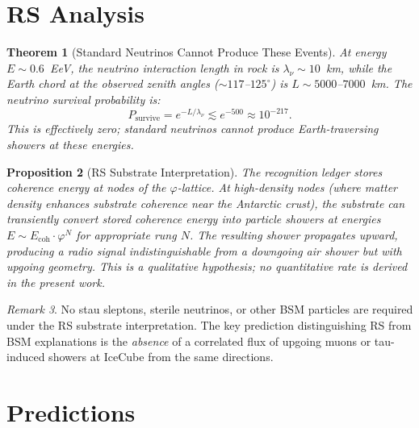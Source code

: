 \documentclass[12pt,a4paper]{article}
\newtheorem{theorem}{Theorem}[section]
\newtheorem{proposition}[theorem]{Proposition}
\theoremstyle{definition}
\theoremstyle{remark}
\newtheorem{remark}[theorem]{Remark}
\begin{document}
\section{RS Analysis}
\label{sec:analysis}

\begin{theorem}[Standard Neutrinos Cannot Produce These Events]
\label{thm:nu-impossible}
At energy $E \sim 0.6$~EeV, the neutrino interaction length in
rock is $\lambda_\nu \sim 10$~km, while the Earth chord at the
observed zenith angles ($\sim 117$--$125^\circ$) is
$L \sim 5000$--$7000$~km.  The neutrino survival probability is:
\begin{equation}
  P_{\mathrm{survive}} = e^{-L/\lambda_\nu} \lesssim e^{-500}
  \approx 10^{-217}.
\end{equation}
This is effectively zero; standard neutrinos cannot produce
Earth-traversing showers at these energies.
\end{theorem}

\begin{proposition}[RS Substrate Interpretation]
\label{prop:substrate}
The recognition ledger stores coherence energy at nodes of the
$\varphi$-lattice.  At high-density nodes (where matter density
enhances substrate coherence near the Antarctic crust), the
substrate can transiently convert stored coherence energy into
particle showers at energies $E \sim E_{\mathrm{coh}} \cdot \varphi^N$
for appropriate rung $N$.  The resulting shower propagates upward,
producing a radio signal indistinguishable from a downgoing air shower
but with upgoing geometry.  This is a qualitative hypothesis; no
quantitative rate is derived in the present work.
\end{proposition}

\begin{remark}
No stau sleptons, sterile neutrinos, or other BSM particles are
required under the RS substrate interpretation.  The key prediction
distinguishing RS from BSM explanations is the \emph{absence} of
a correlated flux of upgoing muons or tau-induced showers at IceCube
from the same directions.
\end{remark}

\section{Predictions}
\label{sec:predict}
\end{document}
